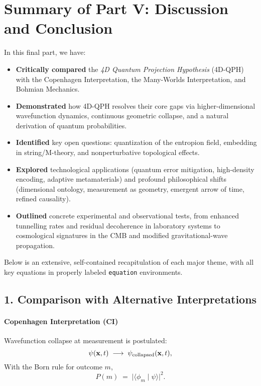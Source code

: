 \documentclass[12pt]{article}
\begin{document}
\section*{Summary of Part V: Discussion and Conclusion}

In this final part, we have:

\begin{itemize}
  \item \textbf{Critically compared} the \emph{4D Quantum Projection Hypothesis} (4D-QPH) with the Copenhagen Interpretation, the Many-Worlds Interpretation, and Bohmian Mechanics.  
  \item \textbf{Demonstrated} how 4D-QPH resolves their core gaps via higher-dimensional wavefunction dynamics, continuous geometric collapse, and a natural derivation of quantum probabilities.  
  \item \textbf{Identified} key open questions: quantization of the entropion field, embedding in string/M-theory, and nonperturbative topological effects.  
  \item \textbf{Explored} technological applications (quantum error mitigation, high-density encoding, adaptive metamaterials) and profound philosophical shifts (dimensional ontology, measurement as geometry, emergent arrow of time, refined causality).  
  \item \textbf{Outlined} concrete experimental and observational tests, from enhanced tunnelling rates and residual decoherence in laboratory systems to cosmological signatures in the CMB and modified gravitational-wave propagation.
\end{itemize}

Below is an extensive, self-contained recapitulation of each major theme, with all key equations in properly labeled \texttt{equation} environments.

\subsection*{1. Comparison with Alternative Interpretations}

\paragraph{Copenhagen Interpretation (CI)}  
Wavefunction collapse at measurement is postulated:
\begin{equation}
\psi(\mathbf{x},t) \;\longrightarrow\; \psi_{\rm collapsed}(\mathbf{x},t),
\label{eq:ci_collapse}
\end{equation}
With the Born rule for outcome \(m\),
\begin{equation}
P(m) \;=\; \bigl|\langle \phi_m \mid \psi \rangle\bigr|^2.
\label{eq:ci_born}
\end{equation}
\end{document}
